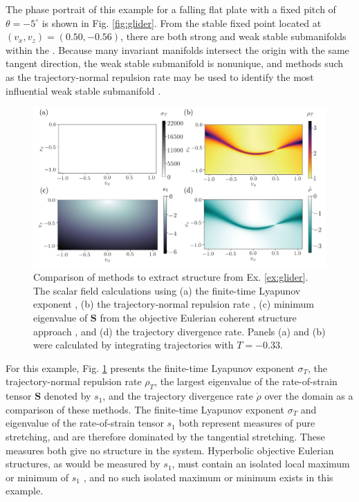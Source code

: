 \documentclass[twocolumn]{svjour3}
\begin{document}
The phase portrait of this example for a falling flat plate with a fixed pitch of $\theta=-5^\circ$ is shown in Fig. \ref{fig:glider}. From the stable fixed point located at $(v_x,v_z)=(0.50, -0.56)$, there are both strong and weak stable submanifolds within the . Because many invariant manifolds intersect the origin with the same tangent direction, the weak stable submanifold is nonunique, and methods such as the trajectory-normal repulsion rate may be used to identify the most influential weak stable submanifold \cite{haller_variational_2011,nave2018global}.

\begin{figure}
\centering
\includegraphics[width=\linewidth]{method-comparison.png}
\caption{Comparison of methods to extract structure from Ex. \ref{ex:glider}. The scalar field calculations using (a) the finite-time Lyapunov exponent \cite{shadden2005definition}, (b) the trajectory-normal repulsion rate \cite{haller_variational_2011}, (c) minimum eigenvalue of $\mathbf{S}$ from the objective Eulerian coherent structure approach \cite{serra_objective_2016}, and (d) the trajectory divergence rate. Panels (a) and (b) were calculated by integrating trajectories with $T=-0.33$.}
\label{fig:method-comparison}
\end{figure}

For this example, Fig. \ref{fig:method-comparison} presents the finite-time Lyapunov exponent $\sigma_T$, the trajectory-normal repulsion rate $\rho_T$, the largest eigenvalue of the rate-of-strain tensor $\mathbf{S}$ denoted by $s_1$, and the trajectory divergence rate $\dot{\rho}$ over the domain as a comparison of these methods. The finite-time Lyapunov exponent $\sigma_T$ and eigenvalue of the rate-of-strain tensor $s_1$ both represent measures of pure stretching, and are therefore dominated by the tangential stretching. These measures both give no structure in the system. Hyperbolic objective Eulerian structures, as would be measured by $s_1$, must contain an isolated local maximum or minimum of $s_1$ \cite{serra_objective_2016}, and no such isolated maximum or minimum exists in this example. 
\end{document}
